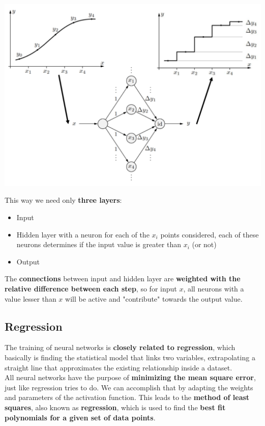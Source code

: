\begin{center}
	\includegraphics[width=0.9\columnwidth]{img/NN/func2}
\end{center}

This way we need only \textbf{three layers}: 
\begin{itemize}
	\item Input \\
	\item Hidden layer with a neuron for each of the $x_i$ points considered, each of these neurons determines if the input value is greater than $x_i$ (or not) \\
	\item Output \\
\end{itemize}

The \textbf{connections} between input and hidden layer are \textbf{weighted with the relative difference between each step}, so for input $x$, all neurons with a value lesser than $x$ will be active and "contribute" towards the output value.\\


\newpage

\subsection{Regression}
The training of neural networks is \textbf{closely related to regression}, which basically is finding the statistical model that links two variables, extrapolating a straight line that approximates the existing relationship inside a dataset.\\

All neural networks have the purpose of \textbf{minimizing the mean square error}, just like regression tries to do. We can accomplish that by adapting the weights and parameters of the activation function. This leads to the \textbf{method of least squares}, also known as \textbf{regression}, which is used to find the \textbf{best fit polynomials for a given set of data points}.\\

